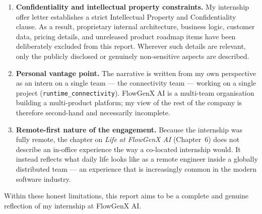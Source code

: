 \begin{enumerate}[leftmargin=*]
    \item \textbf{Confidentiality and intellectual property
    constraints.} My internship offer letter establishes a strict
    Intellectual Property and Confidentiality clause. As a result,
    proprietary internal architecture, business logic, customer data,
    pricing details, and unreleased product roadmap items have been
    deliberately excluded from this report. Wherever such details are
    relevant, only the publicly disclosed or genuinely non-sensitive
    aspects are described.

    \item \textbf{Personal vantage point.} The narrative is written
    from my own perspective as an intern on a single team --- the
    connectivity team --- working on a single project
    (\texttt{runtime\_connectivity}). FlowGenX AI is a multi-team
    organisation building a multi-product platform; my view of the
    rest of the company is therefore second-hand and necessarily
    incomplete.

    \item \textbf{Remote-first nature of the engagement.} Because the
    internship was fully remote, the chapter on \emph{Life at FlowGenX
    AI} (Chapter~6) does not describe an in-office experience the way
    a co-located internship would. It instead reflects what daily life
    looks like as a remote engineer inside a globally distributed
    team --- an experience that is increasingly common in the modern
    software industry.
\end{enumerate}

Within these honest limitations, this report aims to be a complete and
genuine reflection of my internship at FlowGenX AI.
